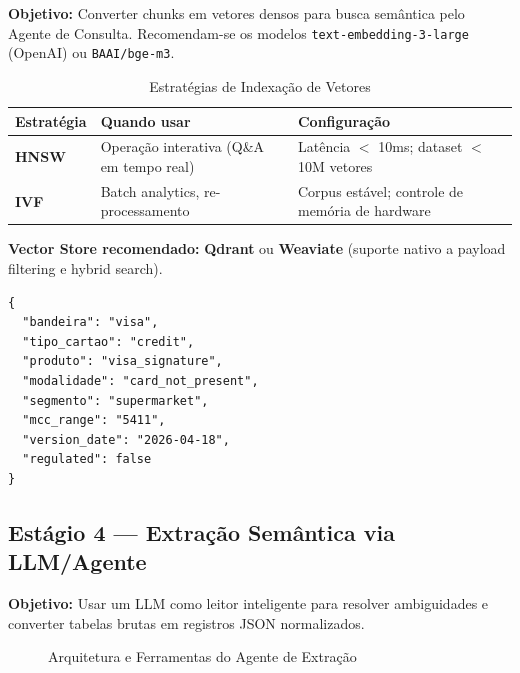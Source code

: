 \documentclass[12pt,a4paper]{article}
\begin{document}
\textbf{Objetivo:} Converter chunks em vetores densos para busca semântica pelo Agente de Consulta. Recomendam-se os modelos \texttt{text-embedding-3-large} (OpenAI) ou \texttt{BAAI/bge-m3}.

\begin{table}[htbp]
\centering
\caption{Estratégias de Indexação de Vetores}
\small
\begin{tabularx}{\textwidth}{l p{4.5cm} p{6.5cm}}
\toprule
\textbf{Estratégia} & \textbf{Quando usar} & \textbf{Configuração} \\
\midrule
\textbf{HNSW} & Operação interativa (Q\&A em tempo real) & Latência $<$ 10ms; dataset $<$ 10M vetores \\
\textbf{IVF} & Batch analytics, re-processamento & Corpus estável; controle de memória de hardware \\
\bottomrule
\end{tabularx}
\end{table}

\textbf{Vector Store recomendado:} \textbf{Qdrant} ou \textbf{Weaviate} (suporte nativo a payload filtering e hybrid search).

\begin{lstlisting}[language={}, caption=Exemplo de Payload de Metadados Indexados]
{
  "bandeira": "visa",
  "tipo_cartao": "credit",
  "produto": "visa_signature",
  "modalidade": "card_not_present",
  "segmento": "supermarket",
  "mcc_range": "5411",
  "version_date": "2026-04-18",
  "regulated": false
}
\end{lstlisting}

\subsection{Estágio 4 --- Extração Semântica via LLM/Agente}

\textbf{Objetivo:} Usar um LLM como leitor inteligente para resolver ambiguidades e converter tabelas brutas em registros JSON normalizados.

\begin{figure}[htbp]
\centering
\small
{}
\caption{Arquitetura e Ferramentas do Agente de Extração}
\label{fig:agente_tools}
\end{figure}
\end{document}
